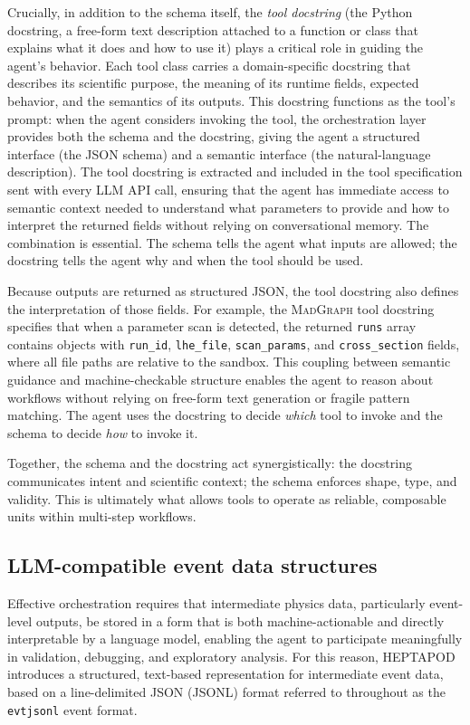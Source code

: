 \documentclass[11pt,oneside]{article}
\numberwithin{equation}{section}
\newcommand{\pkgname}{HEPTAPOD\xspace}
\begin{document}
Crucially, in addition to the schema itself, the \emph{tool docstring} (the Python docstring, a free-form text description attached to a function or class that explains what it does and how to use it) plays a critical role in guiding the agent's behavior. 
Each tool class carries a domain-specific docstring that describes its scientific purpose, the meaning of its runtime fields, expected behavior, and the semantics of its outputs.
This docstring functions as the tool's prompt: when the agent considers invoking the tool, the orchestration layer provides both the schema and the docstring, giving the agent a structured interface (the JSON schema) and a semantic interface (the natural-language description).
The tool docstring is extracted and included in the tool specification sent with every LLM API call, ensuring that the agent has immediate access to semantic context needed to understand what parameters to provide and how to interpret the returned fields without relying on conversational memory.
The combination is essential.
The schema tells the agent what inputs are allowed; the docstring tells the agent why and when the tool should be used.

Because outputs are returned as structured JSON, the tool docstring also defines the interpretation of those fields.
For example, the \textsc{MadGraph} tool docstring specifies that when a parameter scan is detected, the returned \texttt{runs} array contains objects with \texttt{run\_id}, \texttt{lhe\_file}, \texttt{scan\_params}, and \texttt{cross\_section} fields, where all file paths are relative to the sandbox.
This coupling between semantic guidance and machine-checkable structure enables the agent to reason about workflows without relying on free-form text generation or fragile pattern matching.
The agent uses the docstring to decide \emph{which} tool to invoke and the schema to decide \emph{how} to invoke it.

Together, the schema and the docstring act synergistically: the docstring communicates intent and scientific context; the schema enforces shape, type, and validity.
This is ultimately what allows tools to operate as reliable, composable units within multi-step workflows.

\subsection{LLM-compatible event data structures}
\label{subsec:evtjsonl}

Effective orchestration requires that intermediate physics data, particularly event-level outputs, be stored in a form that is both machine-actionable and directly interpretable by a language model, enabling the agent to participate meaningfully in validation, debugging, and exploratory analysis.
For this reason, \pkgname introduces a structured, text-based representation for intermediate event data, based on a line-delimited JSON (JSONL) format referred to throughout as the \texttt{evtjsonl} event format.
\end{document}
